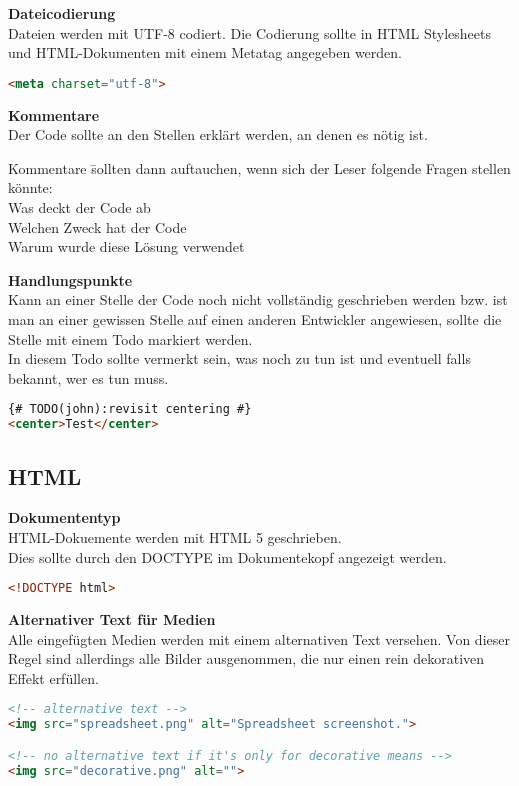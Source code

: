 \textbf{Dateicodierung}\\
Dateien werden mit UTF-8 codiert.
Die Codierung sollte in HTML Stylesheets und HTML-Dokumenten mit einem Metatag angegeben werden.\\
\begin{lstlisting}[language = HTML, caption = Metatag für die UTF-8 Codierung, label = utf-8]
<meta charset="utf-8">
\end{lstlisting}

\textbf{Kommentare}\\
Der Code sollte an den Stellen erklärt werden, an denen es nötig ist.\\
\begin{tabbing}
Kommentare \= sollten dann auftauchen, wenn sich der Leser folgende Fragen stellen könnte:\\
\> Was deckt der Code ab\\
\> Welchen Zweck hat der Code\\
\> Warum wurde diese Lösung verwendet
\end{tabbing}

\textbf{Handlungspunkte}\\
Kann an einer Stelle der Code noch nicht vollständig geschrieben werden bzw. ist man an einer gewissen Stelle auf einen anderen Entwickler angewiesen, sollte die Stelle mit einem Todo markiert werden.\\
In diesem Todo sollte vermerkt sein, was noch zu tun ist und eventuell falls bekannt, wer es tun muss.\\
\begin{lstlisting}[language = HTML, caption = Kennzeichnung eines Handlungspunktes, label = todo]
{# TODO(john):revisit centering #}
<center>Test</center>
\end{lstlisting}
\subsection{HTML}

\textbf{Dokumententyp}\\
HTML-Dokuemente werden mit HTML 5 geschrieben.\\
Dies sollte durch den DOCTYPE im Dokumentekopf angezeigt werden.
\begin{lstlisting}[language = HTML, caption = Kennzeichnung des Dokumententyps, label = doctype]
<!DOCTYPE html>
\end{lstlisting}

\textbf{Alternativer Text für Medien}\\
Alle eingefügten Medien werden mit einem alternativen Text versehen. Von dieser Regel sind allerdings alle Bilder ausgenommen, die nur einen rein dekorativen Effekt erfüllen.
\begin{lstlisting}[language = HTML, caption = Alternativtext, label = alttext]
<!-- alternative text -->
<img src="spreadsheet.png" alt="Spreadsheet screenshot.">

<!-- no alternative text if it's only for decorative means -->
<img src="decorative.png" alt="">
\end{lstlisting}

